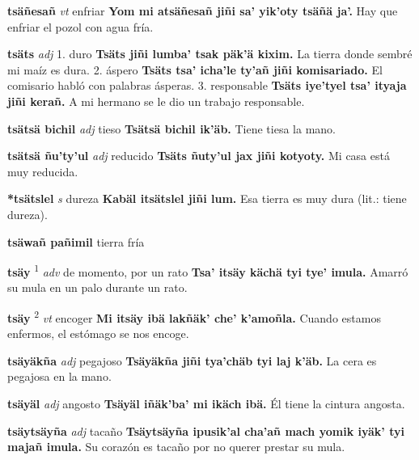 \documentclass[10pt]{scrbook}
\newcommand{\entry}[1]{\textbf{#1}}
\newcommand{\onedefinition}[1]{#1.}
\newcommand{\defsuperscript}[1]{\textsuperscript{#1}}
\newcommand{\partofspeech}[1]{\textit{#1}}
\newcommand{\spanishtranslation}[1]{#1}
\newcommand{\cholexample}[1]{\textbf{#1}}
\newcommand{\exampletranslation}[1]{#1}
\begin{document}
\begin{multicols}{2}
\entry{tsäñesañ}
\partofspeech{vt}
\spanishtranslation{enfriar}
\cholexample{Yom mi atsäñesañ jiñi sa' yik'oty tsäñä ja'.}
\exampletranslation{Hay que enfriar el pozol con agua fría.}

\entry{tsäts}
\partofspeech{adj}
\onedefinition{1}
\spanishtranslation{duro}
\cholexample{Tsäts jiñi lumba' tsak päk'ä kixim.}
\exampletranslation{La tierra donde sembré mi maíz es dura.}
\onedefinition{2}
\spanishtranslation{áspero}
\cholexample{Tsäts tsa' icha'le ty'añ jiñi komisariado.}
\exampletranslation{El comisario habló con palabras ásperas.}
\onedefinition{3}
\spanishtranslation{responsable}
\cholexample{Tsäts iye'tyel tsa' ityaja jiñi kerañ.}
\exampletranslation{A mi hermano se le dio un trabajo responsable.}

\entry{tsätsä bichil}
\partofspeech{adj}
\spanishtranslation{tieso}
\cholexample{Tsätsä bichil ik'äb.}
\exampletranslation{Tiene tiesa la mano.}

\entry{tsätsä ñu'ty'ul}
\partofspeech{adj}
\spanishtranslation{reducido}
\cholexample{Tsäts ñuty'ul jax jiñi kotyoty.}
\exampletranslation{Mi casa está muy reducida.}

\entry{*tsätslel}
\partofspeech{s}
\spanishtranslation{dureza}
\cholexample{Kabäl itsätslel jiñi lum.}
\exampletranslation{Esa tierra es muy dura (lit.: tiene dureza).}

\entry{tsäwañ pañimil}
\spanishtranslation{tierra fría}

\entry{tsäy}
\defsuperscript{1}
\partofspeech{adv}
\spanishtranslation{de momento, por un rato}
\cholexample{Tsa' itsäy kächä tyi tye' imula.}
\exampletranslation{Amarró su mula en un palo durante un rato.}

\entry{tsäy}
\defsuperscript{2}
\partofspeech{vt}
\spanishtranslation{encoger}
\cholexample{Mi itsäy ibä lakñäk' che' k'amoñla.}
\exampletranslation{Cuando estamos enfermos, el estómago se nos encoge.}

\entry{tsäyäkña}
\partofspeech{adj}
\spanishtranslation{pegajoso}
\cholexample{Tsäyäkña jiñi tya'chäb tyi laj k'äb.}
\exampletranslation{La cera es pegajosa en la mano.}

\entry{tsäyäl}
\partofspeech{adj}
\spanishtranslation{angosto}
\cholexample{Tsäyäl iñäk'ba' mi ikäch ibä.}
\exampletranslation{Él tiene la cintura angosta.}

\entry{tsäytsäyña}
\partofspeech{adj}
\spanishtranslation{tacaño}
\cholexample{Tsäytsäyña ipusik'al cha'añ mach yomik iyäk' tyi majañ imula.}
\exampletranslation{Su corazón es tacaño por no querer prestar su mula.}


\end{multicols}
\end{document}
